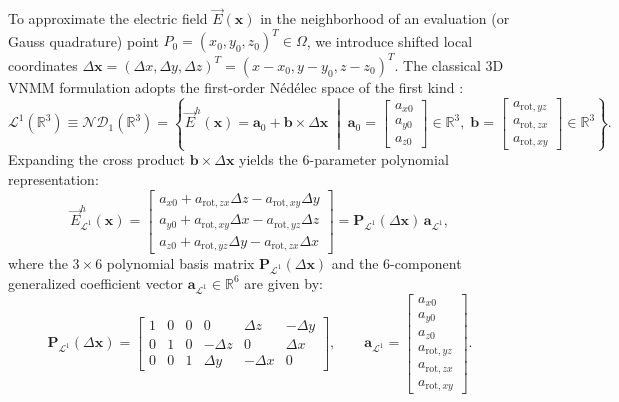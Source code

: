 \documentclass[preprint,12pt]{elsarticle}
\newcommand{\R}{\mathbb{R}}
\begin{document}
To approximate the electric field $\vec{E}(\mathbf{x})$ in the neighborhood of an evaluation (or Gauss quadrature) point $P_0 = (x_0, y_0, z_0)^T \in \Omega$, we introduce shifted local coordinates $\Delta\mathbf{x} = (\Delta x, \Delta y, \Delta z)^T = (x - x_0, y - y_0, z - z_0)^T$. The classical 3D VNMM formulation \cite{Goncalves2020} adopts the first-order N\'{e}d\'{e}lec space of the first kind \cite{Nedelec1980}:
\begin{equation}
    \mathcal{L}^1(\R^3) \equiv \mathcal{ND}_1(\R^3) = \left\{ \vec{E}^h(\mathbf{x}) = \mathbf{a}_0 + \mathbf{b} \times \Delta\mathbf{x} \;\middle|\; \mathbf{a}_0 = \begin{bmatrix} a_{x0} \\ a_{y0} \\ a_{z0} \end{bmatrix} \in \R^3, \; \mathbf{b} = \begin{bmatrix} a_{\text{rot},yz} \\ a_{\text{rot},zx} \\ a_{\text{rot},xy} \end{bmatrix} \in \R^3 \right\}.
    \label{eq:nedelec_space_3d}
\end{equation}
Expanding the cross product $\mathbf{b} \times \Delta\mathbf{x}$ yields the 6-parameter polynomial representation:
\begin{equation}
    \vec{E}^h_{\mathcal{L}^1}(\mathbf{x}) = \begin{bmatrix}
    a_{x0} + a_{\text{rot},zx}\Delta z - a_{\text{rot},xy}\Delta y \\
    a_{y0} + a_{\text{rot},xy}\Delta x - a_{\text{rot},yz}\Delta z \\
    a_{z0} + a_{\text{rot},yz}\Delta y - a_{\text{rot},zx}\Delta x
    \end{bmatrix} = \mathbf{P}_{\mathcal{L}^1}(\Delta\mathbf{x})\,\mathbf{a}_{\mathcal{L}^1},
    \label{eq:l1_expansion_3d}
\end{equation}
where the $3\times 6$ polynomial basis matrix $\mathbf{P}_{\mathcal{L}^1}(\Delta\mathbf{x})$ and the 6-component generalized coefficient vector $\mathbf{a}_{\mathcal{L}^1} \in \R^6$ are given by:
\begin{equation}
    \mathbf{P}_{\mathcal{L}^1}(\Delta\mathbf{x}) = \begin{bmatrix}
    1 & 0 & 0 & 0 & \Delta z & -\Delta y \\
    0 & 1 & 0 & -\Delta z & 0 & \Delta x \\
    0 & 0 & 1 & \Delta y & -\Delta x & 0
    \end{bmatrix}, \qquad
    \mathbf{a}_{\mathcal{L}^1} = \begin{bmatrix}
    a_{x0} \\ a_{y0} \\ a_{z0} \\ a_{\text{rot},yz} \\ a_{\text{rot},zx} \\ a_{\text{rot},xy}
    \end{bmatrix}.
    \label{eq:P_L1_matrix_3d}
\end{equation}
\end{document}
